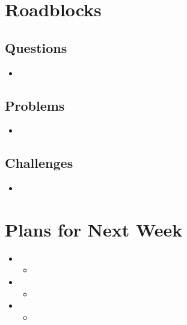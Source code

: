 \documentclass{weeklyreport}
\begin{document}
\pagebreak
\section*{Roadblocks}

\subsection*{Questions}

\begin{itemize}
	\item 
\end{itemize}

\subsection*{Problems}

\begin{itemize}
	\item 
\end{itemize}

\subsection*{Challenges}

\begin{itemize}
    \item 
\end{itemize}

\section*{Plans for Next Week}

\begin{itemize}
	\item 
	\begin{itemize}
		\item 
	\end{itemize}
	\item 
	\begin{itemize}
		\item 
	\end{itemize}
	\item 
	\begin{itemize}
		\item 
	\end{itemize}
\end{itemize}
\end{document}
